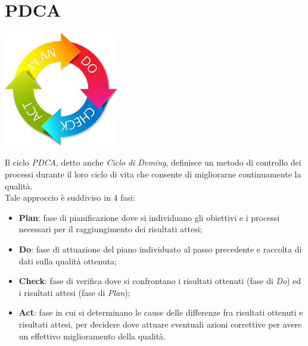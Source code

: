 \newpage
\section{PDCA}

\begin{center}
\includegraphics[keepaspectratio = true, width=5cm]{PDCA.png}
\end{center}

Il ciclo \textit{PDCA}, detto anche \textit{Ciclo di Deming}, definisce un metodo di controllo dei processi durante il loro ciclo di vita che consente di migliorarne continuamente la qualità. \\ Tale approccio è suddiviso in 4 fasi:
\begin{itemize}
\item \textbf{Plan}: fase di pianificazione dove si individuano gli obiettivi e i processi necessari per il raggiungimento dei risultati attesi;
\item \textbf{Do}: fase di attuazione del piano individuato al passo precedente e raccolta di dati sulla qualità ottenuta;
\item \textbf{Check}: fase di verifica dove si confrontano i risultati ottenuti (fase di \textit{Do}) ed i risultati attesi (fase di \textit{Plan});
\item \textbf{Act}: fase in cui si determinano le cause delle differenze fra risultati ottenuti e risultati attesi, per decidere dove attuare eventuali azioni correttive per avere un effettivo miglioramento della qualità.
\end{itemize}